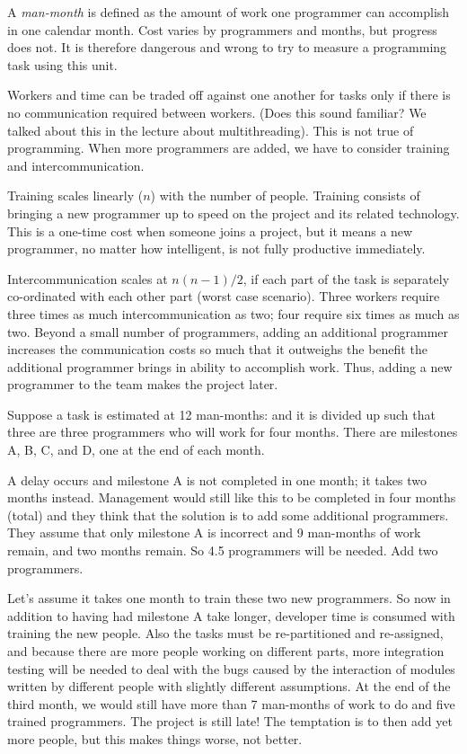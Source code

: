 A \textit{man-month} is defined as the amount of work one programmer can accomplish in one calendar month. Cost varies by programmers and months, but progress does not. It is therefore dangerous and wrong to try to measure a programming task using this unit.

Workers and time can be traded off against one another for tasks only if there is no communication required between workers. (Does this sound familiar? We talked about this in the lecture about multithreading). This is not true of programming. When more programmers are added, we have to consider training and intercommunication.

Training scales linearly ($n$) with the number of people. Training consists of bringing a new programmer up to speed on the project and its related technology. This is a one-time cost when someone joins a project, but it means a new programmer, no matter how intelligent, is not fully productive immediately.

Intercommunication scales at $n (n - 1) / 2$, if each part of the task is separately co-ordinated with each other part (worst case scenario). Three workers require three times as much intercommunication as two; four require six times as much as two. Beyond a small number of programmers, adding an additional programmer increases the communication costs so much that it outweighs the benefit the additional programmer brings in ability to accomplish work. Thus, adding a new programmer to the team makes the project later.

Suppose a task is estimated at 12 man-months: and it is divided up such that three are three programmers who will work for four months. There are milestones A, B, C, and D, one at the end of each month. 

A delay occurs and milestone A is not completed in one month; it takes two months instead. Management would still like this to be completed in four months (total) and they think that the solution is to add some additional programmers. They assume that only milestone A is incorrect and 9 man-months of work remain, and two months remain. So 4.5 programmers will be needed. Add two programmers. 

Let's assume it takes one month to train these two new programmers. So now in addition to having had milestone A take longer, developer time is consumed with training the new people. Also the tasks must be re-partitioned and re-assigned, and because there are more people working on different parts, more integration testing will be needed to deal with the bugs caused by the interaction of modules written by different people with slightly different assumptions. At the end of the third month, we would still have more than 7 man-months of work to do and five trained programmers. The project is still late! The temptation is to then add yet more people, but this makes things worse, not better. 

